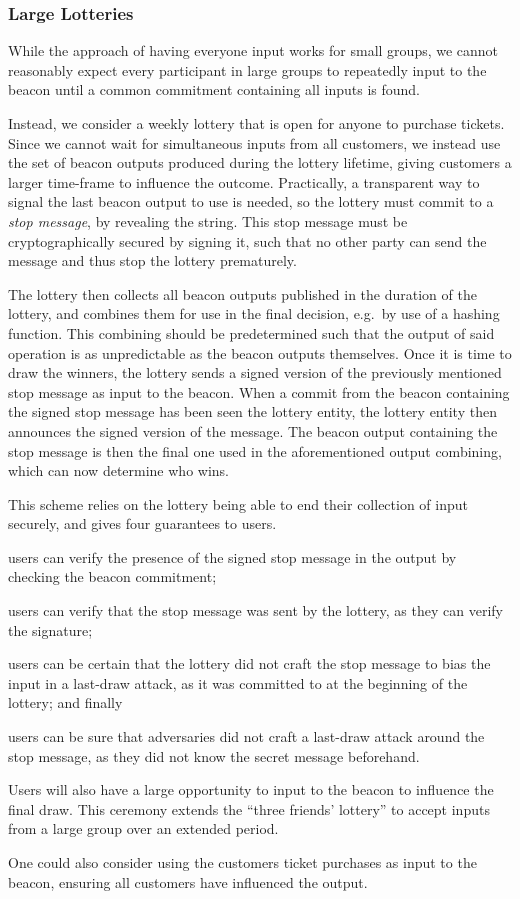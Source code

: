 \subsubsection{Large Lotteries}%
\label{ssub:large_lotteries}
While the approach of having everyone input works for small groups, we cannot reasonably expect every participant in large groups to repeatedly input to the beacon until a common commitment containing all inputs is found.

Instead, we consider a weekly lottery that is open for anyone to purchase tickets.
Since we cannot wait for simultaneous inputs from all customers, we instead use the set of beacon outputs produced during the lottery lifetime, giving customers a larger time-frame to influence the outcome.
Practically, a transparent way to signal the last beacon output to use is needed, so the lottery must commit to a \textit{stop message}, by revealing the string.
This stop message must be cryptographically secured by signing it, such that no other party can send the message and thus stop the lottery prematurely.

The lottery then collects all beacon outputs published in the duration of the lottery, and combines them for use in the final decision, e.g.\ by use of a hashing function.
This combining should be predetermined such that the output of said operation is as unpredictable as the beacon outputs themselves.
Once it is time to draw the winners, the lottery sends a signed version of the previously mentioned stop message as input to the beacon.
When a commit from the beacon containing the signed stop message has been seen the lottery entity, the lottery entity then announces the signed version of the message.
The beacon output containing the stop message is then the final one used in the aforementioned output combining, which can now determine who wins.

This scheme relies on the lottery being able to end their collection of input securely, and gives four guarantees to users.
\begin{enumberate*}
\item users can verify the presence of the signed stop message in the output by checking the beacon commitment;
\item users can verify that the stop message was sent by the lottery, as they can verify the signature;
\item users can be certain that the lottery did not craft the stop message to bias the input in a last-draw attack, as it was committed to at the beginning of the lottery; and finally
\item users can be sure that adversaries did not craft a last-draw attack around the stop message, as they did not know the secret message beforehand.
\end{enumberate*}

Users will also have a large opportunity to input to the beacon to influence the final draw.
This ceremony extends the \enquote{three friends' lottery} to accept inputs from a large group over an extended period.

One could also consider using the customers ticket purchases as input to the beacon, ensuring all customers have influenced the output.


